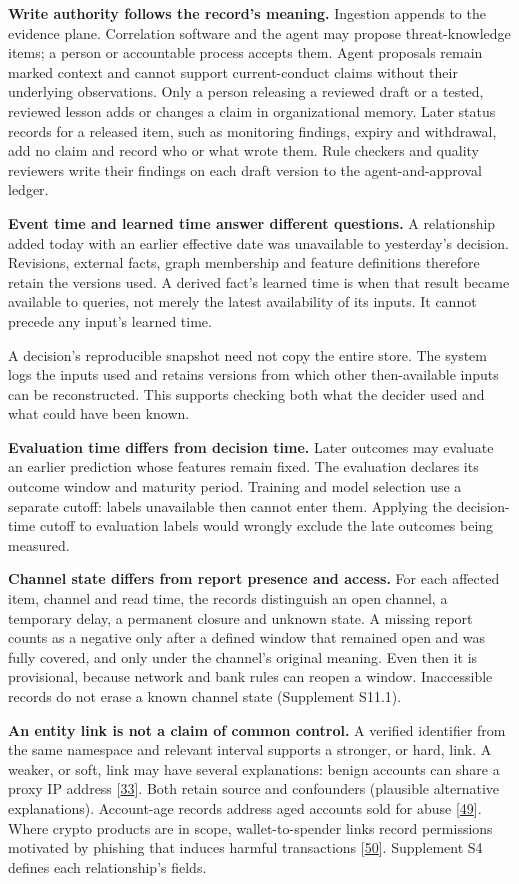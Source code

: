 \documentclass[
  11pt,
]{article}
\begin{document}
\textbf{Write authority follows the record's meaning.} Ingestion appends
to the evidence plane. Correlation software and the agent may propose
threat-knowledge items; a person or accountable process accepts them.
Agent proposals remain marked context and cannot support current-conduct
claims without their underlying observations. Only a person releasing a
reviewed draft or a tested, reviewed lesson adds or changes a claim in
organizational memory. Later status records for a released item, such as
monitoring findings, expiry and withdrawal, add no claim and record who
or what wrote them. Rule checkers and quality reviewers write their
findings on each draft version to the agent-and-approval ledger.

\textbf{Event time and learned time answer different questions.} A
relationship added today with an earlier effective date was unavailable
to yesterday's decision. Revisions, external facts, graph membership and
feature definitions therefore retain the versions used. A derived fact's
learned time is when that result became available to queries, not merely
the latest availability of its inputs. It cannot precede any input's
learned time.

A decision's reproducible snapshot need not copy the entire store. The
system logs the inputs used and retains versions from which other
then-available inputs can be reconstructed. This supports checking both
what the decider used and what could have been known.

\textbf{Evaluation time differs from decision time.} Later outcomes may
evaluate an earlier prediction whose features remain fixed. The
evaluation declares its outcome window and maturity period. Training and
model selection use a separate cutoff: labels unavailable then cannot
enter them. Applying the decision-time cutoff to evaluation labels would
wrongly exclude the late outcomes being measured.

\textbf{Channel state differs from report presence and access.} For each
affected item, channel and read time, the records distinguish an open
channel, a temporary delay, a permanent closure and unknown state. A
missing report counts as a negative only after a defined window that
remained open and was fully covered, and only under the channel's
original meaning. Even then it is provisional, because network and bank
rules can reopen a window. Inaccessible records do not erase a known
channel state (Supplement S11.1).

\textbf{An entity link is not a claim of common control.} A verified
identifier from the same namespace and relevant interval supports a
stronger, or hard, link. A weaker, or soft, link may have several
explanations: benign accounts can share a proxy IP address
{[}\protect\hyperlink{ref-Liu2018GEM}{33}{]}. Both retain source and
confounders (plausible alternative explanations). Account-age records
address aged accounts sold for abuse
{[}\protect\hyperlink{ref-Thomas2013}{49}{]}. Where crypto products are
in scope, wallet-to-spender links record permissions motivated by
phishing that induces harmful transactions
{[}\protect\hyperlink{ref-Chen2025Phishing}{50}{]}. Supplement S4
defines each relationship's fields.
\end{document}
